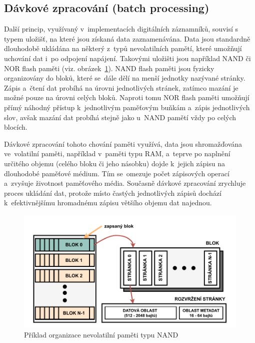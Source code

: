 \newpage


\subsection{Dávkové zpracování (batch processing)}
\label{davkove_zpracovani}
Další princip, využívaný v~implementacích digitálních záznamníků, souvisí s typem uložišť, na které jsou získaná data zaznamenávána. Data jsou standardně dlouhodobě ukládána na některý z~typů nevolatilních pamětí, které umožňují uchování dat i~po odpojení napájení. Takovými uložišti jsou například NAND či NOR flash paměti (viz. obrázek~\ref{fig:batch-processing}). NAND flash paměti jsou fyzicky organizovány do bloků, které se~dále dělí na menší jednotky nazývané stránky. Zápis a~čtení dat probíhá na úrovni jednotlivých stránek, zatímco mazání je možné pouze na úrovni celých bloků.  Naproti tomu NOR flash paměti umožňují přímý náhodný přístup k~jednotlivým paměťovým buňkám a~zápis jednotlivých slov, avšak mazání dat probíhá stejně jako u~NAND pamětí vždy po celých blocích.~\cite{non_volatile_memories, ieee_relationships_among_region_segment_frame_and_cluster}

Dávkové zpracování tohoto chování paměti využívá, data jsou shromažďována ve~volatilní paměti, například v~paměti typu RAM, a~teprve po naplnění určitého objemu (celého bloku či jeho násobku) dojde k~jejich zápisu na dlouhodobé paměťové médium. Tím se~omezuje počet zápisových operací a~zvyšuje životnost paměťového média. Současně dávkové zpracování zrychluje proces ukládání dat, protože místo častých jednotlivých zápisů dochází k~efektivnějšímu hromadnému zápisu většího objemu dat najednou.~\cite{non_volatile_memories, ieee_digital_sound_recorder_arm_sd_card, ieee_relationships_among_region_segment_frame_and_cluster}

\begin{figure}[h]
    \centering
    \includegraphics[width=1.00\textwidth]{obrazky-figures/nand-architecture-1.pdf}
    
    \caption{Příklad organizace nevolatilní paměti typu NAND~\cite{ieee_relationships_among_region_segment_frame_and_cluster}}
    \label{fig:batch-processing}
\end{figure}

